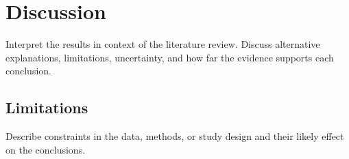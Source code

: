 \chapter{Discussion}

Interpret the results in context of the literature review. Discuss alternative explanations, limitations, uncertainty, and how far the evidence supports each conclusion.

\section{Limitations}

Describe constraints in the data, methods, or study design and their likely effect on the conclusions.
